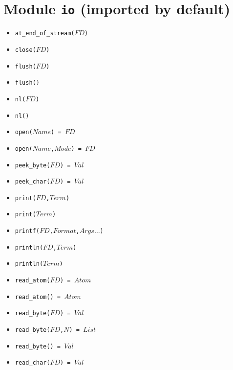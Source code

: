 \documentclass[10pt]{article}
\begin{document}
\begin{multicols}{2}
\begin{scriptsize}
\begin{itemize}
\end{itemize}
\end{scriptsize}
\section*{Module \texttt{io} (imported by default)}
\begin{scriptsize}
\begin{itemize}
   \item \texttt{at\_end\_of\_stream($FD$)}
   \item \texttt{close($FD$)}
   \item \texttt{flush($FD$)}
   \item \texttt{flush()}
   \item \texttt{nl($FD$)}
   \item \texttt{nl()}
   \item \texttt{open($Name$) = $FD$}
   \item \texttt{open($Name$,$Mode$) = $FD$}
   \item \texttt{peek\_byte($FD$) = $Val$}
   \item \texttt{peek\_char($FD$) = $Val$}
   \item \texttt{print($FD$,$Term$)}
   \item \texttt{print($Term$)}
   \item \texttt{printf($FD$,$Format$,$Args\ldots$)}
   \item \texttt{println($FD$,$Term$)}
   \item \texttt{println($Term$)}
   \item \texttt{read\_atom($FD$) = $Atom$}
   \item \texttt{read\_atom() = $Atom$}
   \item \texttt{read\_byte($FD$) = $Val$}
   \item \texttt{read\_byte($FD$,$N$) = $List$}
   \item \texttt{read\_byte() = $Val$}
   \item \texttt{read\_char($FD$) = $Val$}

\end{itemize}
\end{scriptsize}
\end{multicols}
\end{document}
